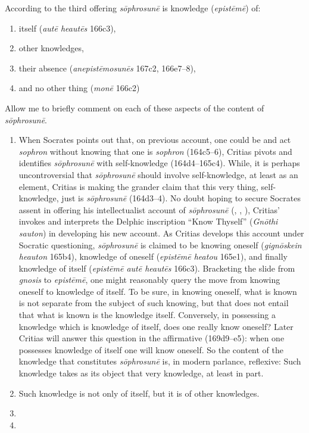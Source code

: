 According to the third offering \emph{sōphrosunē} is knowledge (\emph{epistēmē}) of:
\begin{enumerate}[(1)]
	\item itself (\emph{autē heautēs} 166c3),
	\item other knowledges,
	\item their absence (\emph{anepistēmosunēs} 167c2, 166e7–8),
	\item and no other thing (\emph{monē} 166c2)
\end{enumerate}

Allow me to briefly comment on each of these aspects of the content of \emph{sōphrosunē}.
\begin{enumerate}[(1)]
	\item When Socrates points out that, on previous account, one could be and act \emph{sophron} without knowing that one is \emph{sophron} (164c5–6), Critias pivots and identifies \emph{sōphrosunē} with self-knowledge (164d4–165c4). While, it is perhaps uncontroversial that \emph{sōphrosunē} should involve self-knowledge, at least as an element, Critias is making the grander claim that this very thing, self-knowledge, just is \emph{sōphrosunē} (164d3–4). No doubt hoping to secure Socrates assent in offering his intellectualist account of \emph{sōphrosunē} (\citealt[23–4]{Tuckey:1951aa}, \citealt[81]{Hyland:1981aa}, \citealt[161–2]{Tsouna:2022aa}), Critias' invokes and interprets the Delphic inscription ``Know Thyself'' (\emph{Gnōthi sauton}) in developing his new account. As Critias develops this account under Socratic questioning, \emph{sōphrosunē} is claimed to be knowing oneself (\emph{gignōskein heauton} 165b4), knowledge of oneself (\emph{epistēmē heatou} 165e1), and finally knowledge of itself (\emph{epistēmē autē heautēs} 166c3). Bracketing the slide from \emph{gnosis} to \emph{epistēmē}, one might reasonably query the move from knowing oneself to knowledge of itself. To be sure, in knowing oneself, what is known is not separate from the subject of such knowing, but that does not entail that what is known is the knowledge itself. Conversely, in possessing a knowledge which is knowledge of itself, does one really know oneself? Later Critias will answer this question in the affirmative (169d9–e5): when one possesses knowledge of itself one will know oneself. So the content of the knowledge that constitutes \emph{sōphrosunē} is, in modern parlance, reflexive: Such knowledge takes as its object that very knowledge, at least in part.
	\item Such knowledge is not only of itself, but it is of other knowledges.
	\item 
	\item 
\end{enumerate}




